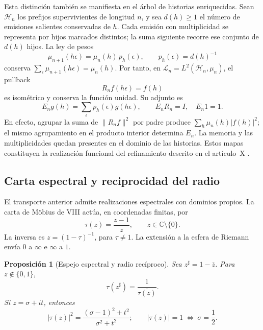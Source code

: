 \documentclass[a4paper,10pt]{article}
\newtheorem{proposition}[theorem]{Proposición}
\theoremstyle{definition}\newtheorem{definition}[theorem]{Definición}
\theoremstyle{remark}\newtheorem{remark}[theorem]{Observación}
\numberwithin{equation}{section}
\begin{document}
Esta distinción también se manifiesta en el árbol de
historias enriquecidas. Sean \(\mathcal H_n\) los prefijos
supervivientes de longitud \(n\), y sea \(d(h)\geq1\) el número de
emisiones salientes conservadas de \(h\). Cada emisión con multiplicidad
se representa por hijos marcados distintos; la suma siguiente recorre
ese conjunto de \(d(h)\) hijos.
La ley de pesos
\[
 \mu_{n+1}(h\epsilon)=\mu_n(h)\,p_h(\epsilon),
 \qquad p_h(\epsilon)=d(h)^{-1}
\]
conserva
\(\sum_{\epsilon}\mu_{n+1}(h\epsilon)=\mu_n(h)\).
Por tanto, en
\(\mathscr L_n=L^2(\mathcal H_n,\mu_n)\), el pullback
\[
 R_nf(h\epsilon)=f(h)
\]
es isométrico y conserva la función unidad. Su adjunto es
\[
 E_ng(h)=\sum_{\epsilon}p_h(\epsilon)g(h\epsilon),
 \qquad E_nR_n=I,\quad E_n1=1.
\]
En efecto, agrupar la suma de \(\|R_nf\|^2\) por padre
produce \(\sum_h\mu_n(h)|f(h)|^2\); el mismo agrupamiento
en el producto interior determina \(E_n\).
La memoria y las multiplicidades quedan presentes en el
dominio de las historias. Estos mapas constituyen la
realización funcional del refinamiento descrito en el
artículo~X \cite{hmtX}.

\subsection{Carta espectral y reciprocidad del radio}

El transporte anterior admite realizaciones espectrales
con dominios propios. La carta de Möbius de VIII actúa,
en coordenadas finitas, por
\begin{equation}
 \tau(z)=\frac{z-1}{z},
 \qquad z\in\mathbb C\setminus\{0\}.
 \label{nt:mobius}
\end{equation}
La inversa es \(z=(1-\tau)^{-1}\), para \(\tau\ne1\).
La extensión a la esfera de Riemann envía \(0\) a
\(\infty\) e \(\infty\) a \(1\).

\begin{proposition}[Espejo espectral y radio recíproco]
Sea \(z^\sharp=1-\overline z\). Para
\(z\notin\{0,1\}\),
\begin{equation}
 \tau(z^\sharp)=\frac1{\overline{\tau(z)}}.
 \label{nt:mirror}
\end{equation}
Si \(z=\sigma+it\), entonces
\begin{equation}
 |\tau(z)|^2
 =\frac{(\sigma-1)^2+t^2}{\sigma^2+t^2};
 \qquad
 |\tau(z)|=1\ \Longleftrightarrow\ \sigma=\frac12.
 \label{nt:critical-circle}
\end{equation}
\end{proposition}
\end{document}
